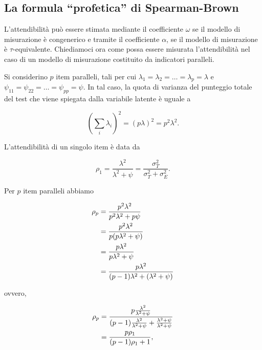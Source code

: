 \documentclass[
  11pt,
]{krantz}
\theoremstyle{definition}
\theoremstyle{definition}
\theoremstyle{definition}
\theoremstyle{definition}
\theoremstyle{remark}
\begin{document}
\hypertarget{la-formula-profetica-di-spearman-brown}{%
\subsection{La formula ``profetica'' di Spearman-Brown}\label{la-formula-profetica-di-spearman-brown}}

L'attendibilità può essere stimata mediante il coefficiente \(\omega\) se il modello di misurazione è congenerico e tramite il coefficiente \(\alpha\), se il modello di misurazione è \(\tau\)-equivalente. Chiediamoci ora come possa essere misurata l'attendibilità nel caso di un modello di misurazione costituito da indicatori paralleli.

Si considerino \(p\) item paralleli, tali per cui \(\lambda_1=\lambda_2=\dots=\lambda_p=\lambda\) e \(\psi_{11}=\psi_{22}=\dots=\psi_{pp}=\psi\). In tal caso, la quota di varianza del punteggio totale del test che viene spiegata dalla variabile latente è uguale a

\[
\left(\sum_i \lambda_i \right)^2 = (p \lambda)^2 = p^2 \lambda^2.
\]

L'attendibilità di un singolo item è data da

\[
\rho_1 = \frac{\lambda^2}{\lambda^2 + \psi} = \frac{\sigma_T^2}{\sigma_T^2+ \sigma_E^2}.
\]

Per \(p\) item paralleli abbiamo

\begin{equation}
\begin{aligned}
  \rho_p &= \frac{p^2 \lambda^2}{p^2 \lambda^2 + p \psi} \notag\\
         &= \frac{p^2 \lambda^2}{ p (p \lambda^2 + \psi)} \notag\\
         &= \frac{p \lambda^2}{ p \lambda^2 + \psi} \notag\\
         &= \frac{p \lambda^2}{(p-1) \lambda^2 + (\lambda^2 + \psi)} \notag
\end{aligned}
\end{equation}

ovvero,

\begin{equation}
\begin{aligned}
  \rho_p &= \frac{p \frac{\lambda^2}{\lambda^2+\psi}}{(p-1) \frac{\lambda^2}{\lambda^2+\psi} + \frac{\lambda^2 + \psi}{\lambda^2+\psi}} \notag\\
  &= \frac{p \rho_1}{(p-1)\rho_1 + 1},
\end{aligned}
\label{eq:spearman-brown-der}
\end{equation}
\end{document}
